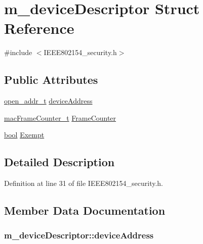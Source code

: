 \hypertarget{structm__device_descriptor}{}\section{m\+\_\+device\+Descriptor Struct Reference}
\label{structm__device_descriptor}


{\ttfamily \#include $<$I\+E\+E\+E802154\+\_\+security.\+h$>$}

\subsection*{Public Attributes}
\begin{DoxyCompactItemize}
\item 
\hyperlink{structopen__addr__t}{open\+\_\+addr\+\_\+t} \hyperlink{structm__device_descriptor_afd633c20f5ade367acad5c97d4ffb37a}{device\+Address}
\item 
\hyperlink{opendefs_8h_af2fecf66c5a2c01ec313af8ce18bf4b9}{mac\+Frame\+Counter\+\_\+t} \hyperlink{structm__device_descriptor_a7506cf717e15b760cbbcfd9fc001eb87}{Frame\+Counter}
\item 
\hyperlink{_p_e___types_8h_a97a80ca1602ebf2303258971a2c938e2}{bool} \hyperlink{structm__device_descriptor_a3197c4d946df2990a30de0e282d96ff9}{Exempt}
\end{DoxyCompactItemize}


\subsection{Detailed Description}


Definition at line 31 of file I\+E\+E\+E802154\+\_\+security.\+h.



\subsection{Member Data Documentation}
\subsubsection[{\texorpdfstring{device\+Address}{deviceAddress}}]{ m\+\_\+device\+Descriptor\+::device\+Address}\hypertarget{structm__device_descriptor_afd633c20f5ade367acad5c97d4ffb37a}{}\label{structm__device_descriptor_afd633c20f5ade367acad5c97d4ffb37a}


